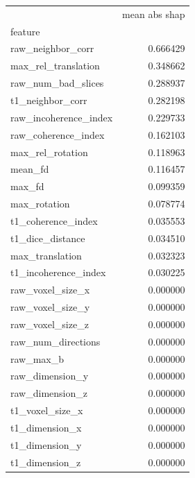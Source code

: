 \documentclass[9pt,lineno]{elife}
\begin{document}
\begin{appendixbox}
\begin{multicols}{2}
\begin{tabular}{lr|}
\toprule
{} &  mean abs shap \\
feature               &                           \\
\midrule
raw\_neighbor\_corr     &                  0.666429 \\
max\_rel\_translation   &                  0.348662 \\
raw\_num\_bad\_slices    &                  0.288937 \\
t1\_neighbor\_corr      &                  0.282198 \\
raw\_incoherence\_index &                  0.229733 \\
raw\_coherence\_index   &                  0.162103 \\
max\_rel\_rotation      &                  0.118963 \\
mean\_fd               &                  0.116457 \\
max\_fd                &                  0.099359 \\
max\_rotation          &                  0.078774 \\
t1\_coherence\_index    &                  0.035553 \\
t1\_dice\_distance      &                  0.034510 \\
max\_translation       &                  0.032323 \\
t1\_incoherence\_index  &                  0.030225 \\
raw\_voxel\_size\_x      &                  0.000000 \\
raw\_voxel\_size\_y      &                  0.000000 \\
raw\_voxel\_size\_z      &                  0.000000 \\
raw\_num\_directions    &                  0.000000 \\
raw\_max\_b             &                  0.000000 \\
raw\_dimension\_y       &                  0.000000 \\
raw\_dimension\_z       &                  0.000000 \\
t1\_voxel\_size\_x       &                  0.000000 \\
t1\_dimension\_x        &                  0.000000 \\
t1\_dimension\_y        &                  0.000000 \\
t1\_dimension\_z        &                  0.000000 \\

\end{tabular}
\end{multicols}
\end{appendixbox}
\end{document}
